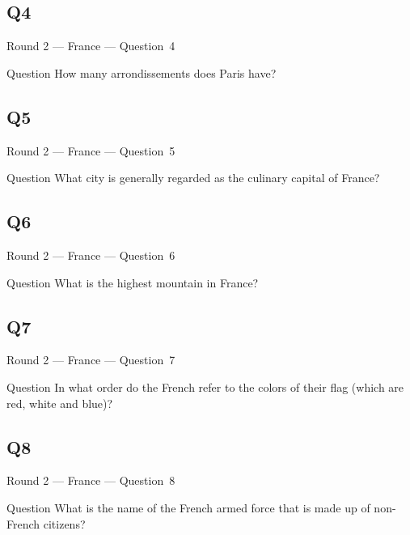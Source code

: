\documentclass[11pt]{beamer}
\begin{document}
\subsection*{Q4}
\begin{frame}[t]{Round 2 --- France --- \mbox{Question 4}}
\begin{block}{Question}
How many arrondissements does Paris have?
\end{block}
\end{frame}
\subsection*{Q5}
\begin{frame}[t]{Round 2 --- France --- \mbox{Question 5}}
\begin{block}{Question}
What city is generally regarded as the culinary capital of France?
\end{block}
\end{frame}
\subsection*{Q6}
\begin{frame}[t]{Round 2 --- France --- \mbox{Question 6}}
\begin{block}{Question}
What is the highest mountain in France?
\end{block}
\end{frame}
\subsection*{Q7}
\begin{frame}[t]{Round 2 --- France --- \mbox{Question 7}}
\begin{block}{Question}
In what order do the French refer to the colors of their flag (which are red, white and blue)?
\end{block}
\end{frame}
\subsection*{Q8}
\begin{frame}[t]{Round 2 --- France --- \mbox{Question 8}}
\begin{block}{Question}
What is the name of the French armed force that is made up of non-French citizens?
\end{block}
\end{frame}
\end{document}
